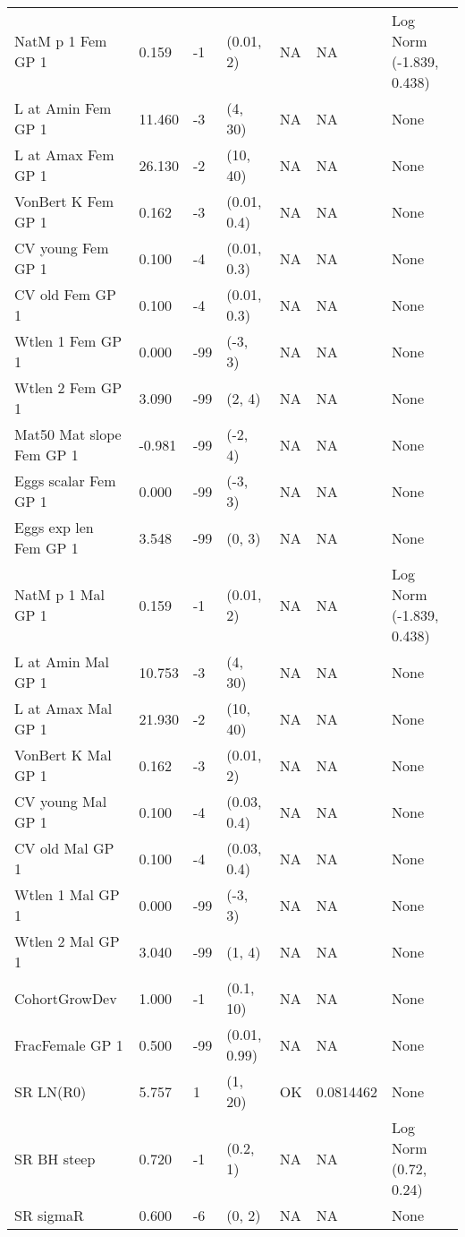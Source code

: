 \documentclass[11pt,
  english,
  a4paper,
]{article}
\begin{document}
\begin{landscape}
\begin{longtable}[t]{>{\raggedright\arraybackslash}p{6cm}lllll>{\raggedright\arraybackslash}p{4cm}}
\endfoot
\bottomrule
\endlastfoot
NatM p 1 Fem GP 1 & 0.159 & -1 & (0.01, 2) & NA & NA & Log Norm (-1.839, 0.438)\\
L at Amin Fem GP 1 & 11.460 & -3 & (4, 30) & NA & NA & None\\
L at Amax Fem GP 1 & 26.130 & -2 & (10, 40) & NA & NA & None\\
VonBert K Fem GP 1 & 0.162 & -3 & (0.01, 0.4) & NA & NA & None\\
CV young Fem GP 1 & 0.100 & -4 & (0.01, 0.3) & NA & NA & None\\
CV old Fem GP 1 & 0.100 & -4 & (0.01, 0.3) & NA & NA & None\\
Wtlen 1 Fem GP 1 & 0.000 & -99 & (-3, 3) & NA & NA & None\\
Wtlen 2 Fem GP 1 & 3.090 & -99 & (2, 4) & NA & NA & None\\
Mat50%
Mat slope Fem GP 1 & -0.981 & -99 & (-2, 4) & NA & NA & None\\
Eggs scalar Fem GP 1 & 0.000 & -99 & (-3, 3) & NA & NA & None\\
Eggs exp len Fem GP 1 & 3.548 & -99 & (0, 3) & NA & NA & None\\
NatM p 1 Mal GP 1 & 0.159 & -1 & (0.01, 2) & NA & NA & Log Norm (-1.839, 0.438)\\
L at Amin Mal GP 1 & 10.753 & -3 & (4, 30) & NA & NA & None\\
L at Amax Mal GP 1 & 21.930 & -2 & (10, 40) & NA & NA & None\\
VonBert K Mal GP 1 & 0.162 & -3 & (0.01, 2) & NA & NA & None\\
CV young Mal GP 1 & 0.100 & -4 & (0.03, 0.4) & NA & NA & None\\
CV old Mal GP 1 & 0.100 & -4 & (0.03, 0.4) & NA & NA & None\\
Wtlen 1 Mal GP 1 & 0.000 & -99 & (-3, 3) & NA & NA & None\\
Wtlen 2 Mal GP 1 & 3.040 & -99 & (1, 4) & NA & NA & None\\
CohortGrowDev & 1.000 & -1 & (0.1, 10) & NA & NA & None\\
FracFemale GP 1 & 0.500 & -99 & (0.01, 0.99) & NA & NA & None\\
SR LN(R0) & 5.757 & 1 & (1, 20) & OK & 0.0814462 & None\\
SR BH steep & 0.720 & -1 & (0.2, 1) & NA & NA & Log Norm (0.72, 0.24)\\
SR sigmaR & 0.600 & -6 & (0, 2) & NA & NA & None\\

\end{longtable}
\end{landscape}
\end{document}
